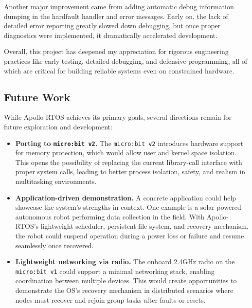 Another major improvement came from adding automatic debug information dumping in the
hardfault handler and error messages. Early on, the lack of detailed error reporting
greatly slowed down debugging, but once proper diagnostics were implemented, it
dramatically accelerated development.

Overall, this project has deepened my appreciation for rigorous engineering practices
like early testing, detailed debugging, and defensive programming, all of which are
critical for building reliable systems even on constrained hardware.


\subsection{Future Work}

While Apollo-RTOS achieves its primary goals, several directions remain for future
exploration and development:

\begin{itemize}
    \item \textbf{Porting to \texttt{micro:bit v2}.} The \texttt{micro:bit v2}
        introduces hardware support for memory protection, which would allow user and
        kernel space isolation. This opens the possibility of replacing the current
        library-call interface with proper system calls, leading to better process
        isolation, safety, and realism in multitasking environments.
    \item \textbf{Application-driven demonstration.} A concrete application could help
        showcase the system’s strengths in context. One example is a solar-powered
        autonomous robot performing data collection in the field. With Apollo-RTOS’s
        lightweight scheduler, persistent file system, and recovery mechanism, the
        robot could suspend operation during a power loss or failure and resume
        seamlessly once recovered.
    \item \textbf{Lightweight networking via radio.} The onboard 2.4GHz radio on the
        \texttt{micro:bit v1} could support a minimal networking stack, enabling
        coordination between multiple devices. This would create opportunities to
        demonstrate the OS's recovery mechanism in distributed scenarios where nodes
        must recover and rejoin group tasks after faults or resets.
\end{itemize}

